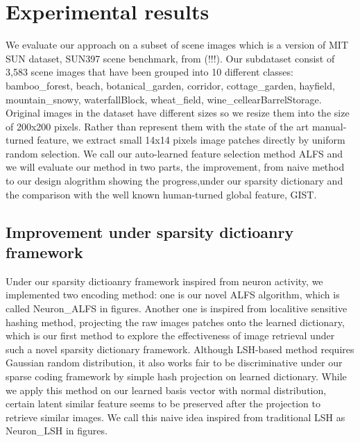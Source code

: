 \documentclass[letterpaper]{article}
\begin{document}
\section{Experimental results}
We evaluate our approach on a subset of scene images which is a version of MIT SUN dataset, SUN397 scene benchmark, from (!!!).  Our subdataset consist of 3,583 scene images that have been grouped into 10 different classes: bamboo\_forest, beach, botanical\_garden, corridor, cottage\_garden, hayfield, mountain\_snowy, waterfallBlock, wheat\_field, wine\_cellearBarrelStorage. Original images in the dataset have different sizes so we resize them into the size of 200x200 pixels. Rather than represent them with the state of the art manual-turned feature, we extract small 14x14 pixels image patches directly by uniform random selection. We call our auto-learned feature selection method ALFS and we will evaluate our method in two parts, the improvement, from naive method to our design alogrithm showing the progress,under our sparsity dictionary and the comparison with the well known human-turned global feature, GIST.


\subsection{Improvement under sparsity dictioanry framework}
Under our sparsity dictioanry framework inspired from neuron activity, we implemented two encoding method: one is our novel ALFS algorithm, which is called Neuron\_ALFS in figures. Another one is inspired from localitive sensitive hashing method, projecting the raw images patches onto the learned dictionary, which is our first method to explore the effectiveness of image retrieval under such a novel sparsity dictionary framework. Although LSH-based method requires Gaussian random distribution, it also works fair to be discriminative  under our sparse coding framework by simple hash projection on learned dictionary. While we apply this method on our learned basis vector with normal distribution, certain latent similar feature seems to be preserved after the projection to retrieve similar images.
We call this naive idea inspired from traditional LSH as Neuron\_LSH in figures.
\end{document}
